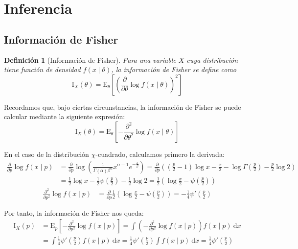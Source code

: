 \documentclass[a4paper, 10pt]{article} %
\newtheorem{definition}{Definición}[section]
\begin{document}
\section{Inferencia}

\subsection{Información de Fisher}

\begin{definition}[Información de Fisher]
  Para una variable $X$ cuya distribución tiene función de densidad $f(x\mid \theta)$, la información de Fisher se define como
  $$\mathrm I_X(\theta)=\mathrm E_\theta\left[\left(\frac \partial {\partial \theta} \log f(x\mid \theta)\right)^2\right]$$
\end{definition}

Recordamos que, bajo ciertas circunstancias, la información de Fisher se puede calcular mediante la siguiente expresión:
$$\mathrm I_X(\theta)=\mathrm E_\theta\left[-\frac {\partial^2} {\partial \theta^2} \log f(x\mid \theta)\right]$$

En el caso de la distribución $\chi$-cuadrado, calculamos primero la derivada:
\begin{align*}
  \frac\partial {\partial p} \log f(x\mid p)
  &= \frac\partial {\partial p} \log\left(\frac 1 {\Gamma(\alpha)\beta^\alpha}x^{\alpha-1}e^{-\frac x \beta}\right)
   = \frac\partial {\partial p}\left(\left(\frac p 2 - 1\right)\log x - \frac x 2 - \log\Gamma\left(\frac p 2\right) - \frac p 2 \log 2\right)\\
  &= \frac 1 2 \log x - \frac 1 2 \psi\left(\frac p 2\right) - \frac 1 2 \log 2 = \frac 1 2\left(\log \frac x 2 - \psi\left(\frac p 2\right)\right)
\end{align*}
\begin{align*}
  \frac {\partial^2} {\partial p^2} \log f(x\mid p)
  &= \frac\partial {\partial p} \frac 1 2\left(\log \frac x 2 - \psi\left(\frac p 2\right)\right) = -\frac 1 4 \psi'\left(\frac p 2\right)
\end{align*}

Por tanto, la información de Fisher nos queda:
\begin{align*}
  \mathrm I_X(p)
  &=\mathrm E_p\left[-\frac {\partial^2} {\partial p^2} \log f(x\mid p)\right] = \int \left(-\frac {\partial^2} {\partial p^2} \log f(x\mid p)\right)f(x\mid p)~\mathrm dx\\
  &=\int \frac 1 4 \psi'\left(\frac p 2\right)f(x\mid p)~\mathrm dx
   =\frac 1 4 \psi'\left(\frac p 2\right)\int f(x\mid p)~\mathrm dx
   =\frac 1 4 \psi'\left(\frac p 2\right)
\end{align*}
\end{document}
